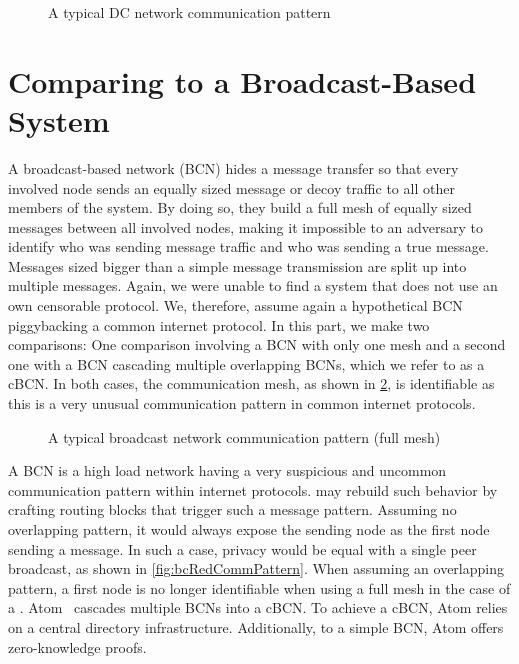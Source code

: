 \begin{figure}[ht]\centering
	
	\caption{A typical DC network communication pattern}
	\label{fig:dcCommPattern}
\end{figure}


\section{Comparing \MessageVortex{} to a Broadcast-Based System}
A broadcast-based network (BCN) hides a message transfer so that every involved node sends an equally sized message or decoy traffic to all other members of the system. By doing so, they build a full mesh of equally sized messages between all involved nodes, making it impossible to an adversary to identify who was sending message traffic and who was sending a true message. Messages sized bigger than a simple message transmission are split up into multiple messages. Again, we were unable to find a system that does not use an own censorable protocol. We, therefore, assume again a hypothetical BCN piggybacking a common internet protocol. In this part, we make two comparisons: One comparison involving a BCN with only one mesh and a second one with a BCN cascading multiple overlapping BCNs, which we refer to as a cBCN. In both cases, the communication mesh, as shown in \cref{fig:bcCommPattern}, is identifiable as this is a very unusual communication pattern in common internet protocols.

\begin{figure}[ht]\centering
	
	\caption{A typical broadcast network communication pattern (full mesh)}
	\label{fig:bcCommPattern}
\end{figure}

A BCN is a high load network having a very suspicious and uncommon communication pattern within internet protocols. \MessageVortex{} may rebuild such behavior by crafting routing blocks that trigger such a message pattern. Assuming no overlapping pattern, it would always expose the sending node as the first node sending a message. In such a case, privacy would be equal with a single peer broadcast, as shown in \cref{fig:bcRedCommPattern}. When assuming an overlapping pattern, a first node is no longer identifiable when using a full mesh in the case of a \VortexMessage{}. Atom~\cite{kwon2016atom} cascades multiple BCNs into a cBCN. To achieve a cBCN, Atom relies on a central directory infrastructure. Additionally, to a simple BCN, Atom offers zero-knowledge proofs.

